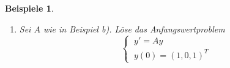\documentclass[12pt]{extreport} %
\theoremstyle{named}
\theoremstyle{nnamed}
\theoremstyle{itshape}
\theoremstyle{normal}
\newtheorem*{beispiele}{Beispiele}
\begin{document}
\begin{beispiele}
\begin{enumerate}
			$$ y^{(1)}(x) \coloneqq e^{2x} \begin{pmatrix} 0 \\ 1 \\ 1\end{pmatrix} \text{ ist eine Lösung von } (*) $$
			$\lambda_{2} = 1$: $\operatorname{kern}(A - I) = \left[ \begin{pmatrix} 1 \\ 1 \\ 0 \end{pmatrix} \right] \subseteq \left[ \begin{pmatrix} 1 \\ 1 \\ 0 \end{pmatrix},  \begin{pmatrix} 0 \\ 0 \\ 1 \end{pmatrix} \right] = \operatorname{kern}(A - I)^{2}$
			$$ y^{(2)}(x) \coloneqq e^{x} \begin{pmatrix} 1 \\ 1 \\ 0 \end{pmatrix} \text{ ist eine Lösung von } (*) $$
			$$ y^{(3)}(x) \coloneqq e^{x} \left( \begin{pmatrix} 0 \\ 0 \\ 1 \end{pmatrix} + x(A - I) \begin{pmatrix} 0 \\ 0 \\ 1 \end{pmatrix} \right) = e^{x} \left( \begin{pmatrix} 0 \\ 0 \\ 1 \end{pmatrix} + x \begin{pmatrix} -1 \\ -1 \\ 0 \end{pmatrix} \right) = e^{x} \begin{pmatrix} -x \\ -x \\ 1 \end{pmatrix}  $$
			Fundamentalsystem von $(*)$: $y^{(1)}, y^{(2)}, y^{(3)}$.
		\item Sei $A$ wie in Beispiel b). Löse das Anfangswertproblem
			$$ \begin{cases} ~ y' = Ay \\ ~y(0) = (1, 0, 1)^{T}  \end{cases} $$

\end{enumerate}
\end{beispiele}
\end{document}
